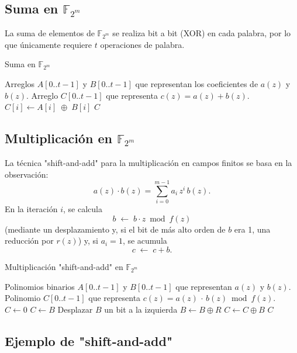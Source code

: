 \subsection{Suma en \texorpdfstring{$\mathbb{F}_{2^m}$}{F2m}}
La suma de elementos de \(\mathbb{F}_{2^m}\) se realiza bit a bit (XOR) en cada palabra, por lo que únicamente requiere \(t\) operaciones de palabra.

\begin{algorithm}
\caption{Suma en \(\mathbb{F}_{2^m}\)}
\label{alg:add_f2m}
\begin{algorithmic}[1]
\REQUIRE Arreglos \(A[0..t-1]\) y \(B[0..t-1]\) que representan los coeficientes de \(a(z)\) y \(b(z)\).
\ENSURE Arreglo \(C[0..t-1]\) que representa \(c(z)=a(z)+b(z)\).
  \STATE \(C[i] \leftarrow A[i]\;\oplus\;B[i]\)
\ENDFOR
\RETURN \(C\)
\end{algorithmic}
\end{algorithm}

\subsection{Multiplicación en \texorpdfstring{$\mathbb{F}_{2^m}$}{F2m}}
La técnica "shift-and-add" para la multiplicación en campos finitos se basa en la observación:
\[
  a(z)\cdot b(z)
  =\sum_{i=0}^{m-1} a_i\,z^i\,b(z).
\]
En la iteración \(i\), se calcula 
\[
  b \;\leftarrow\; b\cdot z \bmod f(z)
\]
(mediante un desplazamiento y, si el bit de más alto orden de \(b\) era 1, una reducción por \(r(z)\)) y, si \(a_i=1\), se acumula 
\[
  c \;\leftarrow\; c + b.
\]

\begin{algorithm}
\caption{Multiplicación "shift-and-add" en \(\mathbb{F}_{2^m}\)}
\label{alg:mul_f2m}
\begin{algorithmic}[1]
\REQUIRE Polinomios binarios \(A[0..t-1]\) y \(B[0..t-1]\) que representan \(a(z)\) y \(b(z)\).
\ENSURE Polinomio \(C[0..t-1]\) que representa \(c(z)=a(z)\,\cdot\,b(z)\bmod f(z)\).
\STATE \(C \gets 0\)
 \STATE \(C \gets B\) \ENDIF
{}
  \STATE Desplazar \(B\) un bit a la izquierda
   \STATE \(B \gets B \oplus R\) \ENDIF
   \STATE \(C \gets C \oplus B\) \ENDIF
\ENDFOR
\RETURN \(C\)
\end{algorithmic}
\end{algorithm}

\subsection*{Ejemplo de "shift-and-add"}

